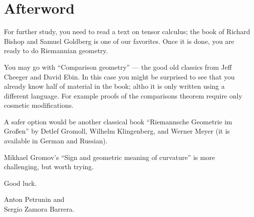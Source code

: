 \chapter*{Afterword}



For further study, you need to read a text on tensor calculus; the book of Richard Bishop and Samuel Goldberg \cite{bishop-goldberg} is one of our favorites.
Once it is done, you are ready to do Riemannian geometry.

You may go with  ``Comparison geometry'' \cite{cheeger-ebin} --- the good old classics from Jeff Cheeger and David Ebin. 
In this case you might be surprised to see that you already know half of material in the book;
altho it is only written using a different language.
For example proofs of the comparisons theorem require only cosmetic modifications.

A safer option would be another classical book ``Riemannsche Geometrie im Großen'' \cite{gromoll-klingenberg-meyer} by 
Detlef Gromoll,
Wilhelm Klingenberg, 
and  Werner Meyer (it is available in German and Russian).

Mikhael Gromov's ``Sign and geometric meaning of curvature'' \cite{gromov-1991} is more challenging, but worth trying. 

Good luck.

\begin{flushright}
Anton Petrunin and\\
Sergio Zamora Barrera.
\end{flushright}
